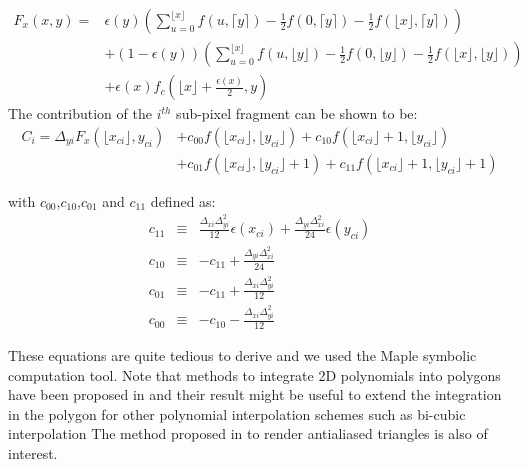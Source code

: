 \documentclass[11pt]{article}
\begin{document}
\begin{equation} 
\begin{split}   
F_x(x,y)=&\epsilon(y) \left(\sum_{u=0}^{\lfloor x \rfloor}f(u,\lceil y \rceil)-\frac{1}{2} f(0,\lceil y \rceil)-\frac{1}{2}f(\lfloor x \rfloor,\lceil y \rceil)\right)\\
&+(1- \epsilon(y)) \left(\sum_{u=0}^{\lfloor x \rfloor}f(u,\lfloor y \rfloor)-\frac{1}{2} f(0,\lfloor y \rfloor)-\frac{1}{2}f(\lfloor x \rfloor,\lfloor y \rfloor)\right)\\
&+\epsilon(x)f_c(\lfloor x\rfloor+\frac{\epsilon(x)}{2},y)
\end{split}
\end{equation}     
    The contribution of the $i^{th}$ sub-pixel fragment can be shown to be:     
\begin{equation}  
\begin{split}
C_i=\Delta_{yi}  F_x(\lfloor x_{ci} \rfloor,y_{ci})
&+c_{00}f(\lfloor x_{ci} \rfloor,\lfloor y_{ci} \rfloor)
+c_{10}f(\lfloor x_{ci} \rfloor+1,\lfloor y_{ci} \rfloor)\\
&+c_{01}f(\lfloor x_{ci} \rfloor,\lfloor y_{ci} \rfloor+1)
+c_{11}f(\lfloor x_{ci} \rfloor+1,\lfloor y_{ci} \rfloor+1)
\end{split}
\end{equation}

with $c_{00}$,$c_{10}$,$c_{01}$ and $c_{11}$ defined as:        
\begin{eqnarray}        
c_{11} &\equiv&  \frac{\Delta_{xi}\Delta_{yi}^2}{12}   \epsilon(x_{ci}) +\frac{\Delta_{yi}\Delta_{xi}^2}{24}\epsilon(y_{ci})\\
c_{10} &\equiv& -c_{11}+\frac{\Delta_{yi}\Delta_{xi}^2}{24} \\
c_{01} &\equiv& -c_{11}+\frac{\Delta_{xi} \Delta_{yi}^2}{12}\\
c_{00} &\equiv& -c_{10}- \frac{\Delta_{xi} \Delta_{yi}^2}{12} 
\end{eqnarray}
             
These equations are quite tedious to derive and we used the Maple symbolic computation tool.
Note that  methods to integrate 2D polynomials into polygons have been proposed in \cite{Tumblin2006,Steger1996,Liggett1988,Singer1993,Strachan1990} and their result might be useful to extend the integration in the polygon for other polynomial interpolation schemes such as bi-cubic interpolation
The method proposed in \cite{McCool1995} to render antialiased triangles is also of interest.     
        
           
\end{document}
